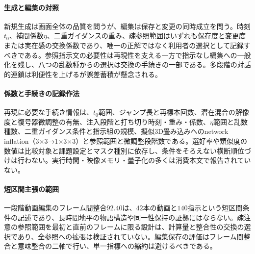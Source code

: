 \documentclass[lualatex,a4paper,10pt]{jlreq}
\begin{document}
\paragraph{生成と編集の対照}
新規生成は画面全体の品質を問うが、編集は保存と変更の同時成立を問う\autocite{btd044,btd045,btd046}。時刻$t_0$、補間係数$\eta$、二重ガイダンスの重み、疎参照範囲はいずれも保存度と変更度または実在感の交換係数であり、唯一の正解ではなく利用者の選択として記録すべきである\autocite{btd044,btd048,btd049,btd050}。参照指示文の必要性は再現性を支える一方で指示なし編集への一般化を残し、八つの乱数種からの選択は交換の手続きの一部である\autocite{btd047,btd048}。多段階の対話的連鎖は利便性を上げるが誤差蓄積が懸念される\autocite{btd049}。

\paragraph{係数と手続きの記録作法}
再現に必要な手続き情報は、$t_0$範囲、ジャンプ長と再標本回数、潜在混合の解像度と復号器微調整の有無、注入段階と打ち切り時刻・重み・係数、$\eta$範囲と乱数種数、二重ガイダンス条件と指示組の規模、擬似3D畳み込みへのnetwork inflation（3×3→1×3×3）と参照範囲と微調整段階数である\autocite{btd044,btd045,btd046,btd047,btd048,btd049,btd050}。選好率や類似度の数値は比較対象と課題設定とマスク種別に依存し、条件をそろえない横断順位づけは行わない\autocite{btd044,btd045,btd047,btd048,btd050}。実行時間・映像メモリ・量子化の多くは消費本文で報告されていない\autocite{btd044,btd045,btd046,btd047,btd048,btd049,btd050}。

\paragraph{短区間主張の範囲}
一段階動画編集のフレーム間整合$92.40$は、$42$本の動画と$140$指示という短区間条件の記述であり、長時間地平の物語構造や同一性保持の証拠にはならない\autocite{btd050}。疎注意の参照範囲を最初と直前のフレームに限る設計は、計算量と整合性の交換の選択であり、全参照への拡張は検証されていない\autocite{btd050}。編集保存の評価はフレーム間整合と意味整合の二軸で行い、単一指標への縮約は避けるべきである\autocite{btd050}。
\end{document}
